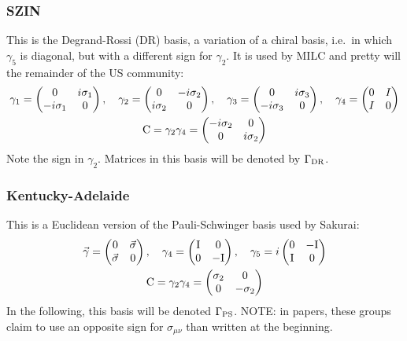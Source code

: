 \documentclass[12pt]{article}
\newcommand{\ch}{{\rm DR}}
\newcommand{\ps}{{\rm PS}}
\begin{document}
\subsubsection{SZIN}

This is the Degrand-Rossi (DR) basis, a variation of a chiral basis, i.e.\
in which $\gamma_5$ is diagonal, but with a different sign for
$\gamma_2$.  It is used by
MILC and pretty will the remainder of the US community:
\begin{gather*}
\gamma_1 = \begin{pmatrix} 0 & i \sigma_1 \nonumber \\ -i \sigma_1 & 0 \end{pmatrix},\quad
\gamma_2 = \begin{pmatrix} 0 & -i \sigma_2 \\ i \sigma_2 & 0 \end{pmatrix},\quad
\gamma_3 = \begin{pmatrix} 0 & i \sigma_3 \\ -i \sigma_3 & 0 \end{pmatrix},\quad
\gamma_4 = \begin{pmatrix} 0 & I\\ I & 0 \end{pmatrix} \\
{\rm C} = \gamma_2\gamma_4 = \begin{pmatrix} -i\sigma_2 & 0\\ 0 & i\sigma_2 \end{pmatrix}
\end{gather*}
Note the sign in $\gamma_2$.  Matrices in this basis will be denoted
by $\Gamma_\ch$.

\subsubsection{Kentucky-Adelaide}
This is a Euclidean version of the Pauli-Schwinger basis used by 
Sakurai:
\begin{gather*}
\vec{\gamma} = \begin{pmatrix} 0 & \vec{\sigma}\\ \vec{\sigma} & 0 \end{pmatrix}, \quad
\gamma_4 = \begin{pmatrix} {\rm I} & 0\\ 0 & -{\rm I} \end{pmatrix}, \quad
\gamma_5 = i \begin{pmatrix} 0 & -{\rm I}\\ {\rm I} & 0 \end{pmatrix} \\
{\rm C} = \gamma_2\gamma_4 = \begin{pmatrix} \sigma_2 & 0\\ 0 & -\sigma_2 \end{pmatrix}
\end{gather*}
In the following, this basis will be denoted $\Gamma_\ps$. NOTE: in papers,
these groups claim to use an opposite sign for $\sigma_{\mu\nu}$ than written
at the beginning.
\end{document}
